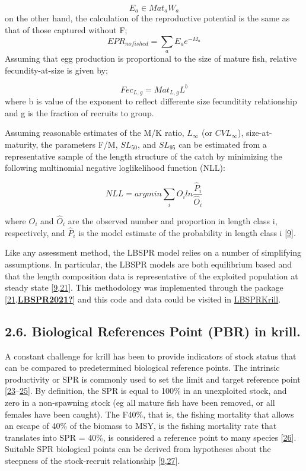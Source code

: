 \documentclass[
]{article}
\begin{document}
\[E_a \in  Mat_a W_a\] on the other hand, the calculation of the
reproductive potential is the same as that of those captured without F;
\[
EPR_{nofished} =
\sum_{a}
 E_ae^{-M_a}
\] Assuming that egg production is proportional to the size of mature
fish, relative fecundity-at-size is given by;

\[
Fec_{L,g} = Mat_{L,g} L^b
\] where b is value of the exponent to reflect differente size
fecunditity relationship and g is the fraction of recruits to group.

Assuming reasonable estimates of the M/K ratio, \(L_{\infty}\) (or
\(CVL_{\infty}\)), size-at-maturity, the parameters F/M, \(SL_{50}\),
and \(SL_{95}\) can be estimated from a representative sample of the
length structure of the catch by minimizing the following multinomial
negative loglikelihood function (NLL):

\[
NLL =
argmin\sum_{i}
 O_i ln\frac{\hat{P}_i}{\hat{O}_i}
\]

where \(O_i\) and \(\hat{O}_i\) are the observed number and proportion
in length class i, respectively, and \(\hat{P}_i\) is the model estimate
of the probability in length class i
{[}\protect\hyperlink{ref-Hordyk2016}{9}{]}.

Like any assessment method, the LBSPR model relies on a number of
simplifying assumptions. In particular, the LBSPR models are both
equilibrium based and that the length composition data is representative
of the exploited population at steady state
{[}\protect\hyperlink{ref-Hordyk2016}{9},\protect\hyperlink{ref-Hordyk2014c}{21}{]}.
This methodology was implemented through the package
{[}\protect\hyperlink{ref-Hordyk2014c}{21},\protect\hyperlink{ref-LBSPR2021}{\textbf{LBSPR2021?}}{]}
and this code and data could be visited in
\href{https://github.com/MauroMardones/LBSPR_Krill}{LBSPRKrill}.

\hypertarget{biological-references-point-pbr-in-krill.}{%
\subsection{2.6. Biological References Point (PBR) in
krill.}\label{biological-references-point-pbr-in-krill.}}

A constant challenge for krill has been to provide indicators of stock
status that can be compared to predetermined biological reference
points. The intrinsic productivity or SPR is commonly used to set the
limit and target reference point
{[}\protect\hyperlink{ref-Goodyear1993}{23}--\protect\hyperlink{ref-Prince2014}{25}{]}.
By definition, the SPR is equal to 100\% in an unexploited stock, and
zero in a non-spawning stock (eg all mature fish have been removed, or
all females have been caught). The F40\%, that is, the fishing mortality
that allows an escape of 40\% of the biomass to MSY, is the fishing
mortality rate that translates into SPR = 40\%, is considered a
reference point to many species
{[}\protect\hyperlink{ref-Clark2002}{26}{]}. Suitable SPR biological
points can be derived from hypotheses about the steepness of the
stock-recruit relationship
{[}\protect\hyperlink{ref-Hordyk2016}{9},\protect\hyperlink{ref-Brooks2013}{27}{]}.
\end{document}
